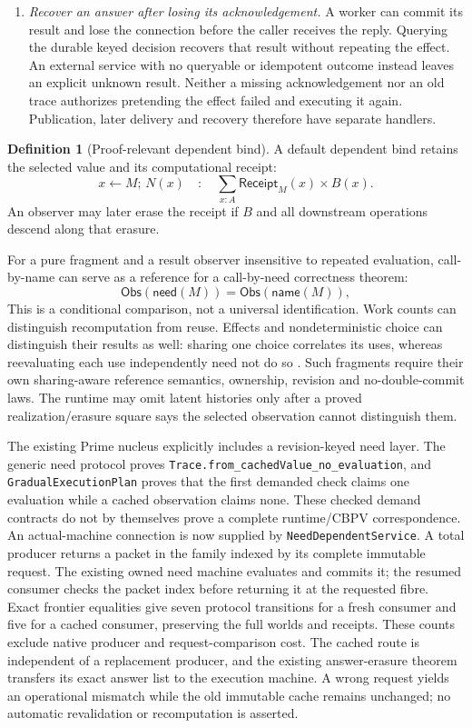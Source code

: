 \documentclass[11pt]{article}
\theoremstyle{definition}
\newtheorem{definition}[theorem]{Definition}
\theoremstyle{remark}
\newcommand{\Obs}{\mathsf{Obs}}
\begin{document}
\begin{enumerate}
\item \emph{Recover an answer after losing its acknowledgement.}
A worker can commit its result and lose the connection before the caller
receives the reply. Querying the durable keyed decision recovers that result
without repeating the effect. An external service with no queryable or
idempotent outcome instead leaves an explicit unknown result. Neither a
missing acknowledgement nor an old trace authorizes pretending the effect
failed and executing it again. Publication, later delivery and recovery
therefore have separate handlers.
\end{enumerate}

\begin{definition}[Proof-relevant dependent bind]
A default dependent bind retains the selected value and its computational
receipt:
\[
  x \leftarrow M;\,N(x)
  \quad:\quad
  \sum_{x:A}\mathsf{Receipt}_M(x)\times B(x).
\]
An observer may later erase the receipt if $B$ and all downstream operations
descend along that erasure.
\end{definition}

For a pure fragment and a result observer insensitive to repeated evaluation,
call-by-name can serve as a reference for a call-by-need correctness theorem:
\[
  \Obs(\mathsf{need}(M))=\Obs(\mathsf{name}(M)),
\]
This is a conditional comparison, not a universal identification. Work counts
can distinguish recomputation from reuse. Effects and nondeterministic choice
can distinguish their results as well: sharing one choice correlates its
uses, whereas reevaluating each use independently need not do so
\cite{CurryLazyEvaluation}. Such fragments require their own sharing-aware
reference semantics, ownership, revision and no-double-commit laws. The
runtime may omit latent histories only after a proved realization/erasure
square says the selected observation cannot distinguish them.

The existing Prime nucleus explicitly includes a revision-keyed need layer.
The generic need protocol proves
\nolinkurl{Trace.from_cachedValue_no_evaluation}, and
\nolinkurl{GradualExecutionPlan} proves that the first demanded check claims
one evaluation while a cached observation claims none. These checked demand
contracts do not by themselves prove a complete runtime/CBPV correspondence.
An actual-machine connection is now supplied by
\nolinkurl{NeedDependentService}. A total producer returns a packet in
the family indexed by its complete immutable request. The existing owned
need machine evaluates and commits it; the resumed consumer checks the packet
index before returning it at the requested fibre. Exact frontier equalities
give seven protocol transitions for a fresh consumer and five for a cached
consumer, preserving the full worlds and receipts. These counts exclude
native producer and request-comparison cost. The cached route is independent
of a replacement producer, and the existing answer-erasure theorem transfers
its exact answer list to the execution machine. A wrong request yields an
operational mismatch while the old immutable cache remains unchanged; no
automatic revalidation or recomputation is asserted.
\end{document}
